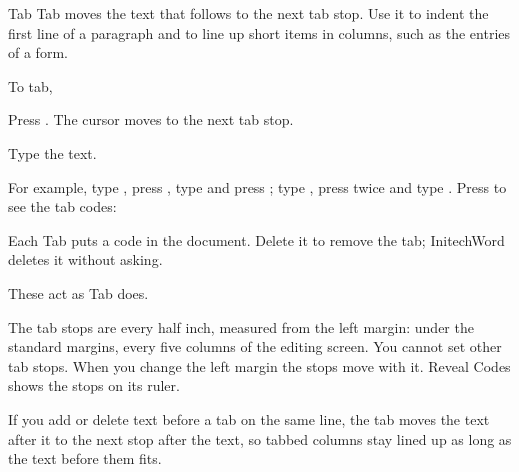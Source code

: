 \begin{Feature}{Tab}
Tab moves the text that follows to the next tab stop.  Use it to indent the
first line of a paragraph and to line up short items in columns, such as
the entries of a form.

To tab,
\begin{WPSteps}
\item Press .  The cursor moves to the next tab stop.
\item Type the text.
\end{WPSteps}

For example, type , press , type
 and press ; type ,
press  twice and type .  Press
 to see the tab codes:
\EndReplay

\Notes
{}
Each Tab puts a \Code{[Tab]} code in the document.  Delete it to remove the
tab; InitechWord deletes it without asking.

These act as Tab does.

The tab stops are every half inch, measured from the left margin: under the
standard margins, every five columns of the editing screen.  You cannot set
other tab stops.  When you change the left margin the stops move with it.
Reveal Codes shows the stops on its ruler.

If you add or delete text before a tab on the same line, the tab moves the
text after it to the next stop after the text, so tabbed columns stay lined
up as long as the text before them fits.

\end{Feature}

